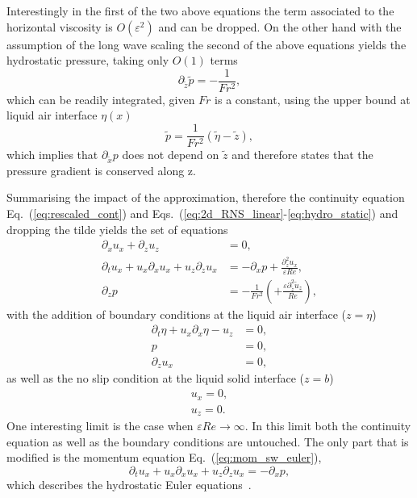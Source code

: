 Interestingly in the first of the two above equations the term associated to the horizontal viscosity is $O(\varepsilon^2)$ and can be dropped.
On the other hand with the assumption of the long wave scaling the second of the above equations yields the hydrostatic pressure, taking only $O(1)$ terms
\begin{equation}\label{eq:hydro_static}
    \partial_{\tilde{z}}\tilde{p} = -\frac{1}{Fr^2},
\end{equation}
which can be readily integrated, given $Fr$ is a constant, using the upper bound at liquid air interface $\eta(x)$ 
\begin{equation}\label{eq:hydro_static_int}
    \tilde{p} = \frac{1}{Fr^2}(\tilde{\eta} - \tilde{z}),    
\end{equation}
which implies that $\partial_{\tilde{x}}p$ does not depend on $\tilde{z}$ and therefore states that the pressure gradient is conserved along z.

Summarising the impact of the approximation, therefore the continuity equation Eq.~(\ref{eq:rescaled_cont}) and Eqs.~(\ref{eq:2d_RNS_linear}-\ref{eq:hydro_static}) and dropping the tilde yields the set of equations 
\begin{align}
    \partial_x u_x + \partial_z u_z &= 0, \label{eq:cont_sw_euler}\\
    \partial_t u_x + u_x\partial_x u_x + u_z\partial_{z} u_x &= -\partial_x p + \frac{\partial_z^2 u_x}{\varepsilon Re}, \label{eq:mom_sw_euler}\\
    \partial_z p &= -\frac{1}{Fr^2} \left(+\frac{\varepsilon\partial_{\tilde{z}}^2 \tilde{u}_z}{Re}\right), \label{eq:hydrostat_sw_euler}
\end{align}
with the addition of boundary conditions at the liquid air interface ($z = \eta$)
\begin{align}
    \partial_t \eta + u_x\partial_x\eta - u_z &= 0, \label{eq:sw_boundaries_top_1}\\
    p &= 0, \label{eq:sw_boundaries_top_2}\\
    \partial_z u_x &= 0, \label{eq:sw_boundaries_top_3}
\end{align}
as well as the no slip condition at the liquid solid interface ($z = b$)
\begin{align}
    u_x = 0, \label{eq:no-slip_sw1}\\
    u_z = 0. \label{eq:no-slip_sw2}
\end{align}
One interesting limit is the case when $\varepsilon Re \rightarrow \infty$.
In this limit both the continuity equation as well as the boundary conditions are untouched.
The only part that is modified is the momentum equation Eq.~(\ref{eq:mom_sw_euler}),
\begin{equation}
    \partial_t u_x + u_x\partial_x u_x + u_z\partial_{z} u_x = -\partial_x p,
\end{equation}
which describes the hydrostatic Euler equations~\cite{brenier_generalized_2008}.

